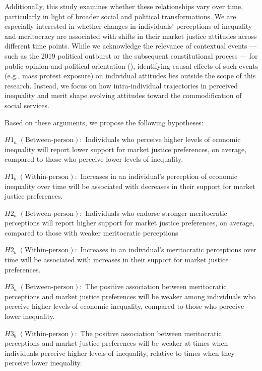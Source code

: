 \documentclass[
  12pt,
]{article}
\begin{document}
Additionally, this study examines whether these relationships vary over
time, particularly in light of broader social and political
transformations. We are especially interested in whether changes in
individuals' perceptions of inequality and meritocracy are associated
with shifts in their market justice attitudes across different time
points. While we acknowledge the relevance of contextual events --- such
as the 2019 political outburst or the subsequent constitutional process
--- for public opinion and political orientation
(), identifying causal effects of such events (e.g., mass protest
exposure) on individual attitudes lies outside the scope of this
research. Instead, we focus on how intra-individual trajectories in
perceived inequality and merit shape evolving attitudes toward the
commodification of social services.

Based on these arguments, we propose the following hypotheses:

\(H1_{a} \; (\text{Between-person}):\) Individuals who perceive higher
levels of economic inequality will report lower support for market
justice preferences, on average, compared to those who perceive lower
levels of inequality.

\(H1_{b} \; (\text{Within-person}):\) Increases in an individual's
perception of economic inequality over time will be associated with
decreases in their support for market justice preferences.

\(H2_{a} \; (\text{Between-person}):\) Individuals who endorse stronger
meritocratic perceptions will report higher support for market justice
preferences, on average, compared to those with weaker meritocratic
perceptions

\(H2_{b} \; (\text{Within-person}):\) Increases in an individual's
meritocratic perceptions over time will be associated with increases in
their support for market justice preferences.

\(H3_{a} \; (\text{Between-person}):\) The positive association between
meritocratic perceptions and market justice preferences will be weaker
among individuals who perceive higher levels of economic inequality,
compared to those who perceive lower inequality.

\(H3_{b} \; (\text{Within-person}):\) The positive association between
meritocratic perceptions and market justice preferences will be weaker
at times when individuals perceive higher levels of inequality, relative
to times when they perceive lower inequality.
\end{document}
